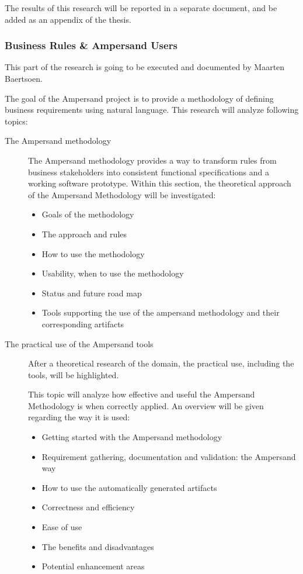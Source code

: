 \noindent
The results of this research will be reported in a separate document, and be added as an appendix of the thesis.

\subsubsection{Business Rules \& Ampersand Users}
This part of the research is going to be executed and documented by Maarten Baertsoen.

The goal of the Ampersand project is to provide a methodology of defining business requirements using natural language.
This research will analyze following topics:

\begin{description}
	\item [The Ampersand methodology ]
	The Ampersand methodology provides a way to transform rules from business stakeholders into consistent functional specifications and a working software prototype.
	Within this section, the theoretical approach of the Ampersand Methodology will be investigated:
	\begin{itemize}
		\item Goals of the methodology
		\item The approach and rules
		\item How to use the methodology
		\item Usability, when to use the methodology
		\item Status and future road map
		\item Tools supporting the use of the ampersand methodology and their corresponding artifacts
	\end{itemize}
	
	\item [The practical use of the Ampersand tools]
	After a theoretical research of the domain, the practical use, including the tools, will be highlighted.
	
	This topic will analyze how effective and useful the Ampersand Methodology is when correctly applied.
	An overview will be given regarding the way it is used:
	\begin{itemize}
		\item Getting started with the Ampersand methodology
		\item Requirement gathering, documentation and validation: the Ampersand way
		\item How to use the automatically generated artifacts
		\item Correctness and efficiency
		\item Ease of use
		\item The benefits and disadvantages
		\item Potential enhancement areas
	\end{itemize}
	
\end{description}


